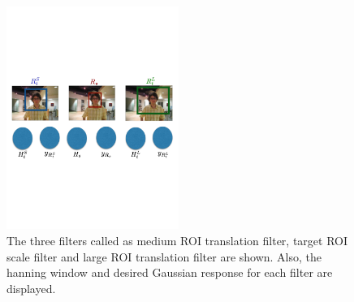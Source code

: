 \documentclass[10pt,twocolumn,letterpaper]{article}
\begin{document}
\begin{figure}[!t]
\includegraphics[width=0.5\textwidth]{figures/Filters_Details.pdf}
\caption{The three filters called as medium ROI translation filter,
  target ROI scale filter and large ROI translation filter are
  shown. Also, the hanning window and desired Gaussian response for
  each filter are displayed.}
\label{fig:Filters}
\end{figure}
\end{document}
